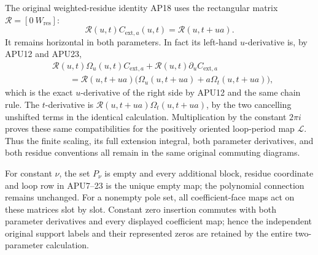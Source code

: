 The original weighted-residue identity AP18 uses the rectangular
matrix \(\mathcal R=[0\ W_{\mathrm{res}}]\):
\[
 \mathcal R(u,t)C_{\mathrm{ext},a}(u,t)
       =\mathcal R(u,t+ua).
\]
It remains horizontal in both parameters.  In fact its left-hand
\(u\)-derivative is, by APU12 and APU23,
\[
 \begin{aligned}
 &\mathcal R(u,t)\Omega_u(u,t)C_{\mathrm{ext},a}
           +\mathcal R(u,t)\partial_uC_{\mathrm{ext},a}\\
 &\qquad=
 \mathcal R(u,t+ua)
       \bigl(\Omega_u(u,t+ua)+a\Omega_t(u,t+ua)\bigr),
 \end{aligned}
\]
which is the exact \(u\)-derivative of the right side by APU12 and
the same chain rule.  The \(t\)-derivative is
\(\mathcal R(u,t+ua)\Omega_t(u,t+ua)\), by the two cancelling
unshifted terms in the identical calculation.
Multiplication by the constant \(2\pi i\) proves these same
compatibilities for the positively oriented loop-period map
\(\mathcal L\).  Thus the finite scaling, its full extension
integral, both parameter derivatives, and both residue conventions
all remain in the same original commuting diagrams.

For constant \(\nu\), the set \(P_\nu\) is empty and every additional
block, residue coordinate and loop row in APU7--23 is the unique
empty map; the polynomial connection remains unchanged.
For a nonempty pole set, all coefficient-face maps act on these
matrices slot by slot.  Constant zero insertion commutes with both
parameter derivatives and every displayed coefficient map; hence
the independent original support labels and their represented
zeros are retained by the entire two-parameter calculation.
